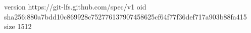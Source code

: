 version https://git-lfs.github.com/spec/v1
oid sha256:880a7bdd10c869928c752776137907458625cf64f77f36def717a903b88fa415
size 1512
